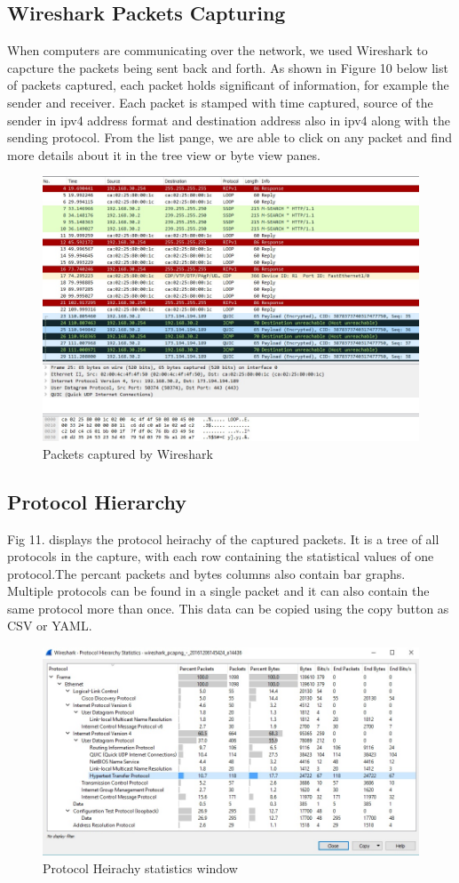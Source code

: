 \documentclass{article}
\begin{document}
\subsection{Wireshark Packets Capturing}
When computers are communicating over the network, we used Wireshark to capcture the packets being sent back and forth. As shown in Figure 10 below list of packets captured, each packet holds significant of information, for example the sender and receiver. Each packet is stamped with time captured, source of the sender in ipv4 address format and destination address also in ipv4 along with the sending protocol. From the list pange, we are able to click on any packet and find more details about it in the tree view or byte view panes. 

\begin{figure}[H]
	\begin{center}
		\includegraphics[width=0.6
\textwidth]{wireshark.jpg}
	\end{center}
	\caption{Packets captured by Wireshark}
	\label{fig:Prd}
\end{figure}

\subsection{Protocol Hierarchy}
Fig 11. displays the protocol heirachy of the captured packets. It is a tree of all protocols in the capture, with each row containing the statistical values of one protocol.The percant packets and bytes columns also contain bar graphs. Multiple protocols can be found in a single packet and it can also contain the same protocol more than once. This data can be copied using the copy button as CSV or YAML.
\begin{figure}[H]
	\begin{center}
		\includegraphics[width=0.6
\textwidth]{Hierarchyst.jpg}
	\end{center}
	\caption{\small  Protocol Heirachy statistics window\newline}
	\label{fig:Prd}
\end{figure}
\end{document}
